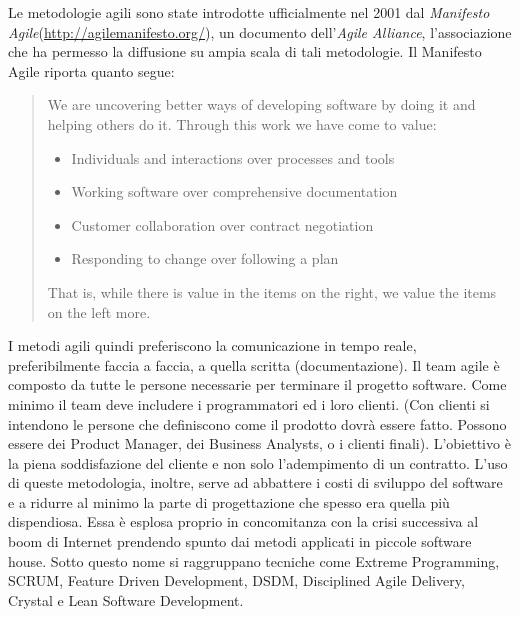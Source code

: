 Le metodologie agili sono state introdotte ufficialmente nel 2001 dal \textit{Manifesto Agile}(\url{http://agilemanifesto.org/}), un documento dell'\textit{Agile Alliance}, l'associazione che ha permesso la diffusione su ampia scala di tali metodologie.
Il Manifesto Agile riporta quanto segue:
\begin{quotation}
We are uncovering better ways of developing software by doing it and helping others do it. Through this work we have come to value:
\begin{itemize}
\item[ ] Individuals and interactions over processes and tools
\item[ ] Working software over comprehensive documentation
\item[ ] Customer collaboration over contract negotiation
\item[ ] Responding to change over following a plan
\end{itemize}
That is, while there is value in the items on the right, we value the items on the left more.
\end{quotation}
I metodi agili quindi preferiscono la comunicazione in tempo reale, preferibilmente faccia a faccia, a quella scritta (documentazione). Il team agile è composto da tutte le persone necessarie per terminare il progetto software. Come minimo il team deve includere i programmatori ed i loro clienti. (Con clienti si intendono le persone che definiscono come il prodotto dovrà essere fatto. Possono essere dei Product Manager, dei Business Analysts, o i clienti finali). L'obiettivo è la piena soddisfazione del cliente e non solo l'adempimento di un contratto. 
L'uso di queste metodologia, inoltre, serve ad abbattere i costi di sviluppo del software e a ridurre al minimo la parte di progettazione che spesso era quella più dispendiosa. Essa è esplosa proprio in concomitanza con la crisi successiva al boom di Internet prendendo spunto dai metodi applicati in piccole software house. Sotto questo nome si raggruppano tecniche come Extreme Programming, SCRUM, Feature Driven Development, DSDM, Disciplined Agile Delivery, Crystal e Lean Software Development.

